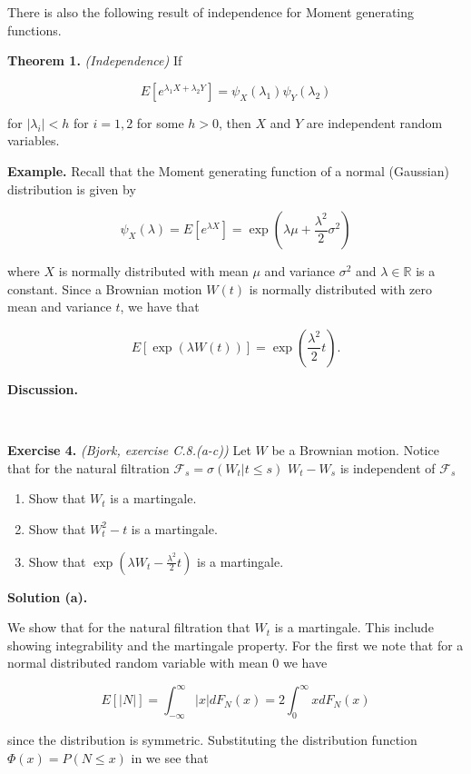 \documentclass[
]{article}
\providecommand{\tightlist}{%
  \setlength{\itemsep}{0pt}\setlength{\parskip}{0pt}}
\begin{document}
There is also the following result of independence for Moment generating
functions.

\textbf{Theorem 1.} \emph{(Independence)} If

\[E\left[e^{\lambda_1X+\lambda_2Y}\right]=\psi_X(\lambda_1)\psi_Y(\lambda_2)\]

for \(\vert\lambda_i\vert<h\) for \(i=1,2\) for some \(h>0\), then \(X\)
and \(Y\) are independent random variables.

\textbf{Example.} Recall that the Moment generating function of a normal
(Gaussian) distribution is given by

\[\psi_X(\lambda)=E\left[e^{\lambda X}\right]=\exp\left(\lambda \mu + \frac{\lambda^2}{2}\sigma^2\right)\]

where \(X\) is normally distributed with mean \(\mu\) and variance
\(\sigma^2\) and \(\lambda\in\mathbb{R}\) is a constant. Since a
Brownian motion \(W(t)\) is normally distributed with zero mean and
variance \(t\), we have that

\[E[\exp(\lambda W(t))]=\exp\left(\frac{\lambda^2}{2}t\right).\]

\textbf{Discussion.}

~

\textbf{Exercise 4.} \emph{(Bjork, exercise C.8.(a-c))} Let \(W\) be a
Brownian motion. Notice that for the natural filtration
\(\mathcal{F}_s=\sigma(W_t\vert t\le s)\) \(W_t-W_s\) is independent of
\(\mathcal{F}_s\)

\begin{enumerate}
\def\labelenumi{\alph{enumi}.}
\tightlist
\item
  Show that \(W_t\) is a martingale.
\item
  Show that \(W^2_t-t\) is a martingale.
\item
  Show that \(\exp(\lambda W_t-\frac{\lambda^2}{2}t)\) is a martingale.
\end{enumerate}

\textbf{Solution (a).}

We show that for the natural filtration that \(W_t\) is a martingale.
This include showing integrability and the martingale property. For the
first we note that for a normal distributed random variable with mean 0
we have

\[E[\vert N\vert]=\int_{-\infty}^\infty \vert x\vert dF_N(x)=2\int_{0}^\infty xdF_N(x)\]

since the distribution is symmetric. Substituting the distribution
function \(\Phi(x)=P(N\le x)\) in we see that
\end{document}
